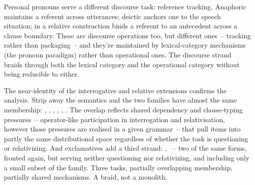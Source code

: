 Personal pronouns serve a different discourse task: reference tracking. Anaphoric  maintains a referent across utterances; deictic  anchors one to the speech situation;  in a relative construction binds a referent to an antecedent across a clause boundary. These are discourse operations too, but different ones~-- tracking rather than packaging~-- and they're maintained by lexical-category mechanisms (the pronoun paradigm) rather than operational ones. The discourse strand braids through both the lexical category and the operational category without being reducible to either.

The near-identity of the interrogative and relative extensions confirms the analysis. Strip away the semantics and the two families have almost the same membership: , , , , , . The overlap reflects shared dependency and clause-typing pressures~-- operator-like participation in interrogation and relativisation, however those pressures are realised in a given grammar~-- that pull items into partly the same distributional space regardless of whether the task is questioning or relativizing. And exclamatives add a third strand: , ~-- two of the same forms, fronted again, but serving neither questioning nor relativizing, and including only a small subset of the family. Three tasks, partially overlapping membership, partially shared mechanisms. A braid, not a monolith.


